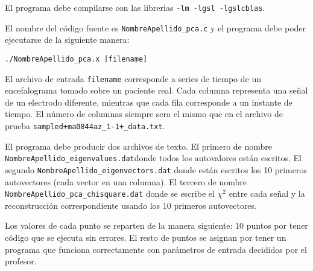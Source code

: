 \documentclass{article}
\begin{document}
\begin{enumerate}
El programa debe compilarse con las librerias \verb"-lm -lgsl -lgslcblas".

El nombre del c\'odigo fuente es \verb"NombreApellido_pca.c" y el
programa debe poder ejecutarse de la siguiente manera: 

\begin{verbatim}
./NombreApellido_pca.x [filename]
\end{verbatim}

El archivo de entrada \verb"filename" corresponde a series de tiempo
de un encefalograma tomado sobre un paciente real. Cada columna
representa una se\~nal de un electrodo diferente, mientras que cada
fila corresponde a un instante de tiempo. El n\'umero de columnas
siempre sera el mismo que en el archivo de prueba   \verb"sampled+ma0844az_1-1+_data.txt".  

El programa debe producir dos archivos de texto. El primero de nombre
\verb"NombreApellido_eigenvalues.dat"donde todos los autovalores
est\'an escritos. El segundo \verb"NombreApellido_eigenvectors.dat"
donde est\'an escritos los 10 primeros autovectores (cada vector en una
columna). El tercero de nombre
\verb"NombreApellido_pca_chisquare.dat" donde se escribe el $\chi^2$
entre cada se\~nal y la reconstrucci\'on correspondiente usando los 10
primeros autovectores.


\end{enumerate}

Los valores de cada punto se reparten de la manera siguiente: $10$ puntos por tener c\'odigo que se ejecuta sin errores. El resto de puntos se asignan por tener un programa que funciona correctamente con par\'ametros de entrada decididos por el profesor.
\end{document}
